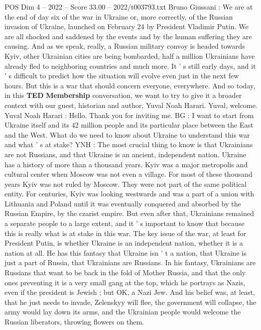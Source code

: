 \begin{textsample}{POS Dim 4 – 2022 – Score 33.00 – 2022/t003793.txt}  \label{ex:f4_pos_028}
Bruno Giussani : We are at the end of day six of the war in Ukraine or, more correctly, of the Russian invasion of Ukraine, launched on February 24 by President Vladimir Putin.
We are all shocked and saddened by the events and by the human suffering they are causing.
And as we speak, really, a Russian military convoy is headed towards Kyiv, other Ukrainian cities are being bombarded, half a million Ukrainians have already fled to neighboring countries and much more.
It ' s still early days, and it ' s difficult to predict how the situation will evolve even just in the next few hours.
But this is a war that should concern everyone, everywhere.
And so today, in this \textbf{TED} \textbf{Membership} conversation, we want to try to give it a broader context with our guest, historian and author, Yuval Noah Harari.
Yuval, welcome.
Yuval Noah Harari : Hello.
Thank you for inviting me.
BG : I want to start from Ukraine itself and its 42 million people and its particular place between the East and the West.
What do we need to know about Ukraine to understand this war and what ' s at stake?
YNH : The most crucial thing to know is that Ukrainians are not Russians, and that Ukraine is an ancient, independent nation.
Ukraine has a history of more than a thousand years.
Kyiv was a major metropolis and cultural center when Moscow was not even a village.
For most of these thousand years Kyiv was not ruled by Moscow.
They were not part of the same political entity.
For centuries, Kyiv was looking westwards and was a part of a union with Lithuania and Poland until it was eventually conquered and absorbed by the Russian Empire, by the czarist empire.
But even after that, Ukrainians remained a separate people to a large extent, and it ' s important to know that because this is really what is at stake in this war.
The key issue of the war, at least for President Putin, is whether Ukraine is an independent nation, whether it is a nation at all.
He has this fantasy that Ukraine isn ' t a nation, that Ukraine is just a part of Russia, that Ukrainians are Russians.
In his fantasy, Ukrainians are Russians that want to be back in the fold of Mother Russia, and that the only ones preventing it is a very small gang at the top, which he portrays as Nazis, even if the president is Jewish ; but OK, a Nazi Jew.
And his belief was, at least, that he just needs to invade, Zelenskyy will flee, the government will collapse, the army would lay down its arms, and the Ukrainian people would welcome the Russian liberators, throwing flowers on them.

\end{textsample}
